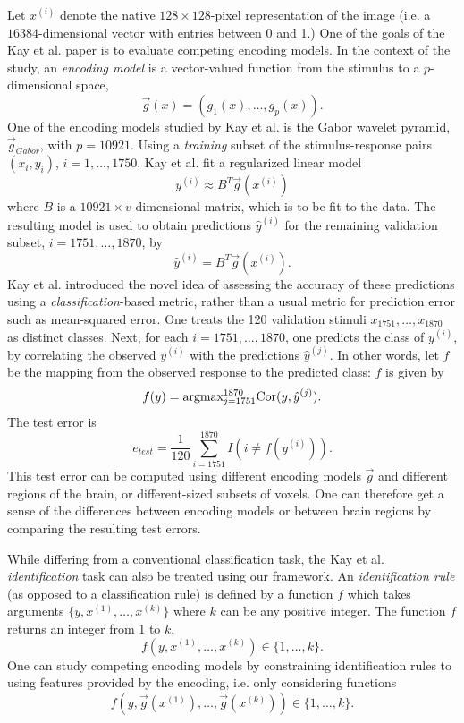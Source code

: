 \documentclass[12pt]{article}
\begin{document}
Let $x^{(i)}$ denote the native $128 \times 128$-pixel representation
of the image (i.e. a $16384$-dimensional vector with entries between 0
and 1.)  One of the goals of the Kay et al. paper is to evaluate
competing encoding models.  In the context of the study,
an \emph{encoding model} is a vector-valued function from the stimulus
to a $p$-dimensional space,
\[
\vec{g}(x) = (g_1(x),\hdots, g_{p}(x)).
\]
One of the encoding models studied by Kay et al. is the Gabor wavelet pyramid,
$\vec{g}_{Gabor}$, with $p = 10921$.
Using a \emph{training} subset of the stimulus-response pairs $(x_i, y_i)$, $i = 1,\hdots, 1750$,
Kay et al. fit a regularized linear model
\[
y^{(i)} \approx B^T \vec{g}(x^{(i)})
\]
where $B$ is a $10921 \times v$-dimensional matrix, which is to be fit to the data.
The resulting model is used to obtain predictions $\hat{y}^{(i)}$ for the remaining validation subset,
$i = 1751,\hdots, 1870$,
by
\[
\hat{y}^{(i)} = B^T \vec{g}(x^{(i)}).
\]
Kay et al. introduced the novel idea of assessing the accuracy of
these predictions using a \emph{classification}-based metric, rather
than a usual metric for prediction error such as mean-squared error.
One treats the 120 validation stimuli $x_{1751},\hdots, x_{1870}$ as distinct classes.
Next, for each $i = 1751, \hdots, 1870$, one predicts the class of $y^{(i)}$,
by correlating the observed $y^{(i)}$ with the predictions $\hat{y}^{(j)}$.
In other words, let $f$ be the mapping from the observed response to the predicted class:
$f$ is given by
\[
f(y) = \text{argmax}_{j =1751}^{1870} \text{Cor}(y, \hat{y}^{(j)}).
\]
The test error is
\[
e_{test} = \frac{1}{120} \sum_{i=1751}^{1870} I(i \neq f(y^{(i)})).
\]
This test error can be computed using different encoding models
$\vec{g}$ and different regions of the brain, or different-sized
subsets of voxels.
One can therefore get a sense of the differences between encoding models
or between brain regions by comparing the resulting test errors.


While differing from a conventional classification task, the Kay et
al. \emph{identification} task can also be treated using our
framework.  An \emph{identification rule} (as opposed to a
classification rule) is defined by a function $f$ which takes arguments
$\{y, x^{(1)},\hdots, x^{(k)}\}$ where $k$ can be any positive integer.
The function $f$ returns an integer from 1 to $k$,
\[
f(y, x^{(1)},\hdots, x^{(k)}) \in \{1,\hdots, k\}.
\]
One can study competing encoding models by constraining identification rules
to using features provided by the encoding, i.e. only considering functions
\[
f(y, \vec{g}(x^{(1)}),\hdots, \vec{g}(x^{(k)})) \in \{1,\hdots, k\}.
\]
\end{document}
